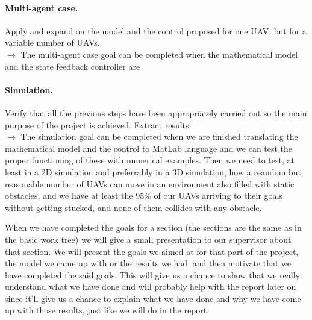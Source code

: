 \documentclass{article}
\begin{document}
		\paragraph{Multi-agent case.} Apply and expand  on the model and the control proposed for one UAV, but for a variable number of UAVs.\\
		$\rightarrow$ The multi-agent case goal can be completed when the mathematical model and the state feedback controller are %
		
		\paragraph{Simulation.} Verify that all the previous steps have been appropriately carried out so the main purpose of the project is achieved. Extract results. \\
		$\rightarrow$ The simulation goal can be completed when we are finished translating the mathematical model and the control to MatLab language and we can test the proper functioning of these with numerical examples. Then we need to test, at least in a 2D simulation and preferrably in a 3D simulation, how a reandom but reasonable number of UAVs can move in an environment also filled with static obstacles, and we have at least the 95\% of our UAVs arriving to their goals without getting stucked, and none of them collides with any obstacle. %

		\vspace{2em}
		 When we have completed the goals for a section (the sections are the same as in the basic work tree) we will give a small presentation to our supervisor about that section. We will present the goals we aimed at for that part of the project, the model we came up with or the results we had, and then motivate that we have completed the said goals. This will give us a chance to show that we really understand what we have done and will probably help with the report later on since it'll give us a chance to explain what we have done and why we have come up with those results, just like we will do in the report.  

	\bigskip
\end{document}
